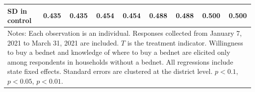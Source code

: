 {{\begin{tabular}{l*{8}{c}}
SD in control   &    0.435         &    0.435         &    0.454         &    0.454         &    0.488         &    0.488         &    0.500         &    0.500         \\
\hline\hline
\multicolumn{9}{p{.94\linewidth}}{\scriptsize Notes: Each observation is an individual. Responses collected from January 7, 2021 to March 31, 2021 are included. \(T\) is the treatment indicator. Willingness to buy a bednet and knowledge of where to buy a bednet are elicited only among respondents in households without a bednet. All regressions include state fixed effects. Standard errors are clustered at the district level. \sym{*} \(p<0.1\), \sym{**} \(p<0.05\), \sym{***} \(p<0.01\).}\\
\end{tabular}
}%

}

